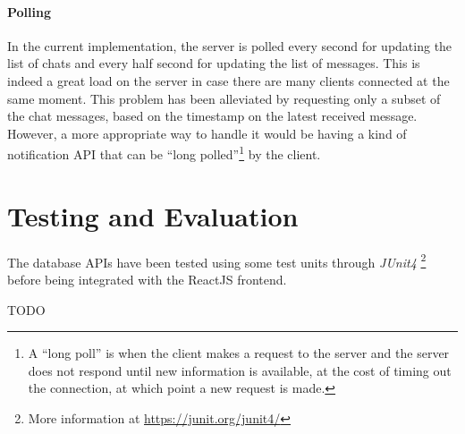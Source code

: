 \documentclass[10pt]{article}
\begin{document}
\paragraph{Polling}
In the current implementation, the server is polled every second for updating 
the list of chats and every half second for updating the list of messages. This 
is indeed a great load on the server in case there are many clients connected 
at the same moment. 
This problem has been alleviated by requesting only a subset of the chat 
messages, based on the timestamp on the latest received message.
However, 
a more appropriate way to handle it would be having a kind of notification API
that can be ``long polled''\footnote{A ``long poll'' is when the client 
makes a request to the server and the server does not respond until new 
information is available, at the cost of timing out the connection, at which 
point a new request is made.} by the client.

\section{Testing and Evaluation}

The database APIs have been tested using some test units through \emph{JUnit4}
\footnote{More information at \url{https://junit.org/junit4/}} before being 
integrated with the ReactJS frontend.

TODO
\end{document}
